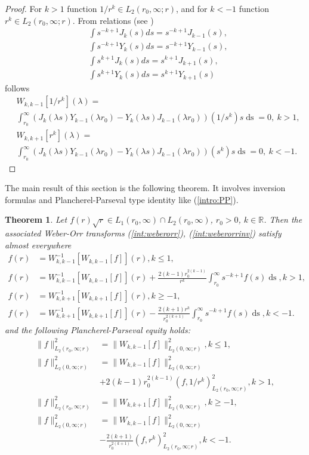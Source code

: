 \documentclass[manuscript, printscheme]{paper}
\newtheorem{thm}{Theorem}[section]
\newcommand{\RM}{\mathbb{R}}
\newcommand{\ds}{\operatorname{ds}}
\begin{document}
\begin{proof}For $k>1$ function $1/r^k \in L_2(r_0,\infty; r)$,
and for $k<-1$ function $r^k \in L_2(r_0,\infty; r)$. From relations (see \cite{BE})
\begin{align*}
&\int s^{-k+1}J_k(s)ds=s^{-k+1}J_{k-1}(s),\\
&\int s^{-k+1}Y_k(s)ds=s^{-k+1}Y_{k-1}(s),\\
&\int s^{k+1}J_k(s)ds=s^{k+1}J_{k+1}(s),\\
&\int s^{k+1}Y_k(s)ds=s^{k+1}Y_{k+1}(s)
\end{align*}
follows
\begin{align*}
&W_{k,k-1}[1/r^k](\lambda) = \\ & \int_{r_0}^\infty \left ( J_{k}(\lambda s)Y_{k-1}(\lambda r_0) - Y_{k}(\lambda s)J_{k-1}(\lambda r_0) \right ) \left ( 1/s^k\right ) s\ds = 0,~k>1, \\
&W_{k,k+1}[r^k](\lambda) = \\ & \int_{r_0}^\infty \left ( J_{k}(\lambda s)Y_{k-1}(\lambda r_0) - Y_{k}(\lambda s)J_{k-1}(\lambda r_0) \right ) \left ( s^k\right ) s\ds = 0,~k<-1.
\end{align*}
\end{proof}

The main result of this section is the following theorem. It involves inversion formulas and  Plancherel-Parseval type identity like (\ref{intro:PP}).

\begin{thm}\label{wkk1:thm}Let $f(r) \sqrt r \in L_1(r_0,\infty)\cap L_2(r_0,\infty)$, $r_0>0$, $k \in \RM$. Then the associated Weber-Orr transforms (\ref{int:weberorr}), (\ref{int:weberorrinv}) satisfy  almost everywhere 
\begin{align*}
f(r) &= W^{-1}_{k,k-1}\left [W_{k,k-1} [f] \right ](r), k\leq 1, \\
f(r) &= W^{-1}_{k,k-1}\left [W_{k,k-1} [f] \right ](r) +  \frac {2(k-1) r_0^{2(k-1)}} {r^k} \int_{r_0}^\infty s^{-k+1} f(s) \ds,k>1,\\
f(r) &= W^{-1}_{k,k+1}\left [W_{k,k+1} [f] \right ](r), k\geq -1, \\
f(r) &= W^{-1}_{k,k+1}\left [W_{k,k+1} [f] \right ](r) -  \frac {2(k+1) r^{k}} {r_0^{2(k+1)}} \int_{r_0}^\infty s^{-k+1} f(s) \ds,k<-1.
\end{align*}
and the following Plancherel-Parseval equity holds:
\begin{align*}
\|f\|_{L_2(r_0,\infty; r)}^2 &= \| W_{k,k-1}[f] \|_{L_2(0,\infty; r) }^2 , k\leq 1, \\
\|f\|_{L_2(0,\infty; r) }^2 &= \| W_{k,k-1}[f] \|_{L_2(0,\infty; r) } ^2 \\
&+ {2(k-1)} r_0^{2(k-1)} \left (f,1/r^k \right )^2_{L_2(r_0,\infty; r)}, k> 1,\\
\|f\|_{L_2(r_0,\infty; r)}^2 &= \| W_{k,k+1}[f] \|_{L_2(0,\infty; r) }^2 , k\geq -1, \\
\|f\|_{L_2(0,\infty; r) }^2 &= \| W_{k,k-1}[f] \|_{L_2(0,\infty; r) } ^2 \\
&- \frac{2(k+1)}{r_0^{2(k+1)}} \left (f,r^k \right )^2_{L_2(r_0,\infty; r)}, k< -1.
\end{align*}
\end{thm}
\end{document}
